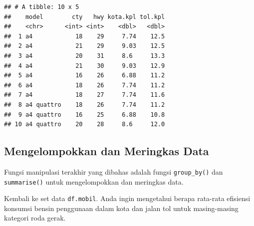 \documentclass[openany]{book}
\newenvironment{Shaded}{\begin{snugshade}}{\end{snugshade}}
\newcommand{\KeywordTok}[1]{\textcolor[rgb]{0.13,0.29,0.53}{\textbf{#1}}}
\newcommand{\DataTypeTok}[1]{\textcolor[rgb]{0.13,0.29,0.53}{#1}}
\newcommand{\DecValTok}[1]{\textcolor[rgb]{0.00,0.00,0.81}{#1}}
\newcommand{\FloatTok}[1]{\textcolor[rgb]{0.00,0.00,0.81}{#1}}
\newcommand{\StringTok}[1]{\textcolor[rgb]{0.31,0.60,0.02}{#1}}
\newcommand{\CommentTok}[1]{\textcolor[rgb]{0.56,0.35,0.01}{\textit{#1}}}
\newcommand{\OperatorTok}[1]{\textcolor[rgb]{0.81,0.36,0.00}{\textbf{#1}}}
\newcommand{\NormalTok}[1]{#1}
\begin{document}
\begin{Shaded}
\end{Shaded}

\begin{verbatim}
## # A tibble: 10 x 5
##    model        cty   hwy kota.kpl tol.kpl
##    <chr>      <int> <int>    <dbl>   <dbl>
##  1 a4            18    29     7.74    12.5
##  2 a4            21    29     9.03    12.5
##  3 a4            20    31     8.6     13.3
##  4 a4            21    30     9.03    12.9
##  5 a4            16    26     6.88    11.2
##  6 a4            18    26     7.74    11.2
##  7 a4            18    27     7.74    11.6
##  8 a4 quattro    18    26     7.74    11.2
##  9 a4 quattro    16    25     6.88    10.8
## 10 a4 quattro    20    28     8.6     12.0
\end{verbatim}

\subsection{Mengelompokkan dan Meringkas
Data}\label{mengelompokkan-dan-meringkas-data}

Fungsi manipulasi terakhir yang dibahas adalah fungsi
\texttt{group\_by()} dan \texttt{summarise()} untuk mengelompokkan dan
meringkas data.

Kembali ke set data \texttt{df.mobil}. Anda ingin mengetahui berapa
rata-rata efisiensi konsumsi bensin penggunaan dalam kota dan jalan tol
untuk masing-masing kategori roda gerak.

\begin{Shaded}
\end{Shaded}
\end{document}
